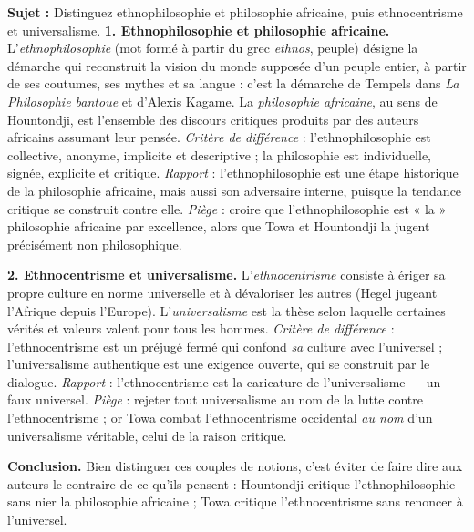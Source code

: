 \documentclass[11pt]{article}
\begin{document}
\begin{exoresolu}
\textbf{Sujet :} Distinguez ethnophilosophie et philosophie africaine, puis ethnocentrisme et universalisme.
\tcblower
\textbf{1. Ethnophilosophie et philosophie africaine.} L'\emph{ethnophilosophie} (mot formé à partir du grec \emph{ethnos}, peuple) désigne la démarche qui reconstruit la vision du monde supposée d'un peuple entier, à partir de ses coutumes, ses mythes et sa langue : c'est la démarche de Tempels dans \emph{La Philosophie bantoue} et d'Alexis Kagame. La \emph{philosophie africaine}, au sens de Hountondji, est l'ensemble des discours critiques produits par des auteurs africains assumant leur pensée. \emph{Critère de différence} : l'ethnophilosophie est collective, anonyme, implicite et descriptive ; la philosophie est individuelle, signée, explicite et critique. \emph{Rapport} : l'ethnophilosophie est une étape historique de la philosophie africaine, mais aussi son adversaire interne, puisque la tendance critique se construit contre elle. \emph{Piège} : croire que l'ethnophilosophie est « la » philosophie africaine par excellence, alors que Towa et Hountondji la jugent précisément non philosophique.

\textbf{2. Ethnocentrisme et universalisme.} L'\emph{ethnocentrisme} consiste à ériger sa propre culture en norme universelle et à dévaloriser les autres (Hegel jugeant l'Afrique depuis l'Europe). L'\emph{universalisme} est la thèse selon laquelle certaines vérités et valeurs valent pour tous les hommes. \emph{Critère de différence} : l'ethnocentrisme est un préjugé fermé qui confond \emph{sa} culture avec l'universel ; l'universalisme authentique est une exigence ouverte, qui se construit par le dialogue. \emph{Rapport} : l'ethnocentrisme est la caricature de l'universalisme — un faux universel. \emph{Piège} : rejeter tout universalisme au nom de la lutte contre l'ethnocentrisme ; or Towa combat l'ethnocentrisme occidental \emph{au nom} d'un universalisme véritable, celui de la raison critique.

\textbf{Conclusion.} Bien distinguer ces couples de notions, c'est éviter de faire dire aux auteurs le contraire de ce qu'ils pensent : Hountondji critique l'ethnophilosophie sans nier la philosophie africaine ; Towa critique l'ethnocentrisme sans renoncer à l'universel.
\end{exoresolu}
\end{document}

